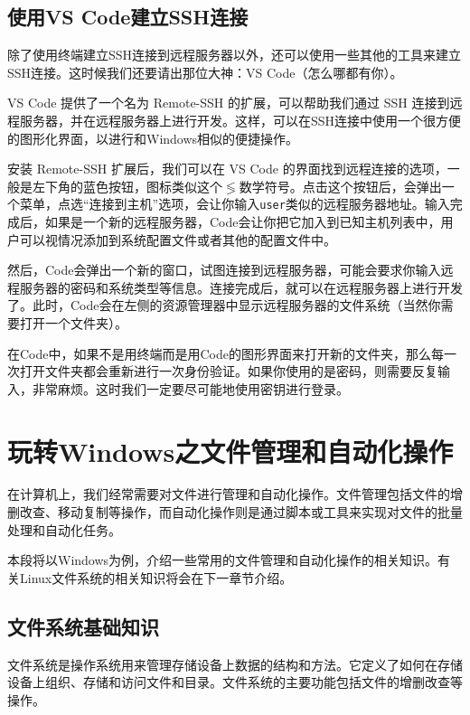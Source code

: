 \documentclass[../main.tex]{subfiles}
\begin{document}
\subsection{使用VS Code建立SSH连接}

除了使用终端建立SSH连接到远程服务器以外，还可以使用一些其他的工具来建立SSH连接。这时候我们还要请出那位大神：VS Code（怎么哪都有你）。

VS Code 提供了一个名为 Remote-SSH 的扩展，可以帮助我们通过 SSH 连接到远程服务器，并在远程服务器上进行开发。这样，可以在SSH连接中使用一个很方便的图形化界面，以进行和Windows相似的便捷操作。

安装 Remote-SSH 扩展后，我们可以在 VS Code 的界面找到远程连接的选项，一般是左下角的蓝色按钮，图标类似这个$\lessgtr$数学符号。点击这个按钮后，会弹出一个菜单，点选“连接到主机”选项，会让你输入\texttt{user\@host}类似的远程服务器地址。输入完成后，如果是一个新的远程服务器，Code会让你把它加入到已知主机列表中，用户可以视情况添加到系统配置文件或者其他的配置文件中。

然后，Code会弹出一个新的窗口，试图连接到远程服务器，可能会要求你输入远程服务器的密码和系统类型等信息。连接完成后，就可以在远程服务器上进行开发了。此时，Code会在左侧的资源管理器中显示远程服务器的文件系统（当然你需要打开一个文件夹）。

在Code中，如果不是用终端而是用Code的图形界面来打开新的文件夹，那么每一次打开文件夹都会重新进行一次身份验证。如果你使用的是密码，则需要反复输入，非常麻烦。这时我们一定要尽可能地使用密钥进行登录。

\section{玩转Windows之文件管理和自动化操作}\label{sec:windows-file-management}

在计算机上，我们经常需要对文件进行管理和自动化操作。文件管理包括文件的增删改查、移动复制等操作，而自动化操作则是通过脚本或工具来实现对文件的批量处理和自动化任务。

本段将以Windows为例，介绍一些常用的文件管理和自动化操作的相关知识。有关Linux文件系统的相关知识将会在下一章节介绍。

\subsection{文件系统基础知识}

文件系统是操作系统用来管理存储设备上数据的结构和方法。它定义了如何在存储设备上组织、存储和访问文件和目录。文件系统的主要功能包括文件的增删改查等操作。
\end{document}

